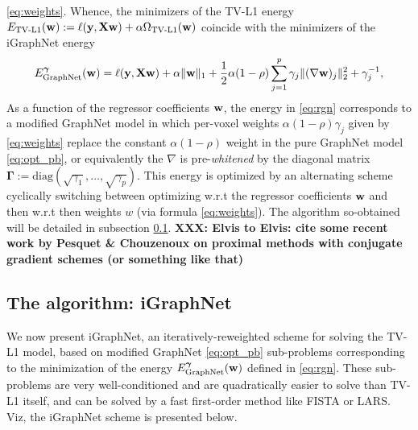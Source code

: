\eqref{eq:weights}. Whence, the minimizers of the TV-L1 energy
$E_{\text{TV-L1}}(\mathbf{w}) := \ell(\mathbf{y},\mathbf{X}\mathbf{w}) + \alpha \Omega_{\text{TV-L1}}(\mathbf{w})$ coincide with the minimizers of
the iGraphNet energy
\begin{equation}
\begin{split}
E_{\text{GraphNet}}^{\boldsymbol{\gamma}}(\mathbf{w}) = \ell(\mathbf{y},\mathbf{X}\mathbf{w}) +
\alpha \|\mathbf{w}\|_1+ \frac{1}{2}\alpha (1 - \rho)
\sum_{j=1}^p \gamma_j\|(\nabla \mathbf{w})_j\|_2^2
+ \gamma_j^{-1},
\end{split}
\label{eq:rgn}
\end{equation}
As a function of the regressor coefficients $\mathbf{w}$, the energy in
\eqref{eq:rgn} corresponds to a modified
GraphNet model in which per-voxel weights $\alpha(1 - \rho)\gamma_j$ given
by \eqref{eq:weights} replace the constant $\alpha(1 - \rho)$ weight
in the pure GraphNet model \eqref{eq:opt_pb}, or
equivalently the $\nabla$ is pre-\textit{whitened} by the diagonal
matrix $\boldsymbol{\Gamma} := \mathrm{diag}(\sqrt{\gamma_1},\ldots,\sqrt{\gamma_p})$. This energy
is optimized by an alternating scheme cyclically switching between
optimizing w.r.t the regressor coefficients $\mathbf{w}$ and then w.r.t
then weights $w$ (via formula \eqref{eq:weights}). The algorithm
so-obtained will be detailed in subsection \ref{sec:algo}.
\textbf{XXX: Elvis to Elvis: cite some recent work by Pesquet \& Chouzenoux
  on proximal methods with conjugate gradient schemes (or something like that)}
\subsection{The algorithm: iGraphNet}
\label{sec:algo}
We now present iGraphNet, an iteratively-reweighted scheme for
solving the TV-L1 model, based on modified GraphNet \eqref{eq:opt_pb}
sub-problems corresponding to the minimization of the energy
$E_{\text{GraphNet}}^{\boldsymbol{\gamma}}(\mathbf{w})$ defined in
\eqref{eq:rgn}. These sub-problems  are very well-conditioned and are
quadratically easier to solve than TV-L1 itself, and can be solved by
a fast first-order method like FISTA or LARS. Viz, the iGraphNet
scheme is presented below.

